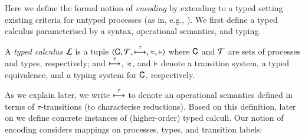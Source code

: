\noi Here we define the formal notion of \emph{encoding} by 
extending to a typed setting existing criteria for untyped processes (as in, e.g.,
\cite{Nestmann00,Palamidessi03,DBLP:conf/lics/PalamidessiSVV06,DBLP:journals/iandc/Gorla10,DBLP:conf/icalp/LanesePSS10,DBLP:journals/tcs/FuL10,DBLP:journals/corr/abs-1208-2750}). 
We first define a typed calculus parameterised by a syntax, operational semantics, and typing.

\smallskip 

\begin{definition}\label{d:tcalculus}\rm
A \emph{typed calculus} $\mathcal{L}$ is a tuple
          $\langle \mathsf{C}, \cal{T}, \stackrel{\tau}{\longmapsto}, \approx, \vdash \rangle$
	where $\mathsf{C}$ and $\cal{T}$ are sets of processes and types, 
respectively; and $\stackrel{\tau}{\longmapsto}$, $\approx$, and $\vdash$ 
	denote a transition system, a typed equivalence, and a typing system for $\mathsf{C}$, respectively. 
\end{definition}

%
%
%
%

\smallskip 

\noi 
As we explain later, we write $\stackrel{\tau}{\longmapsto}$ to denote an operational semantics defined in terms of
$\tau$-transitions (to characterise reductions).
Based on this definition, later on we define concrete instances of (higher-order) typed calculi.
Our notion of encoding considers mappings on processes, 
types, and transition labels: 

